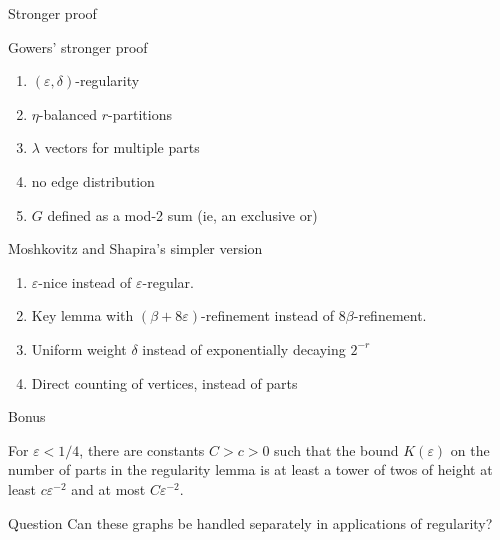 \documentclass{beamer}
\newcommand{\1}{\mathbbm{1}}
\newcommand{\eps}{\varepsilon}
\begin{document}
\begin{frame}{Stronger proof}
  \begin{block}{Gowers' stronger proof}
    \begin{enumerate}
      \pause
    \item $(\eps, \delta)$-regularity

      \pause
      \item $\eta$-balanced $r$-partitions

            \pause
      \item $\lambda$ vectors for multiple parts

            \pause
      \item no edge distribution

            \pause
      \item $G$ defined as a mod-2 sum (ie, an exclusive or)
    \end{enumerate}
  \end{block}

  \pause
  \begin{block}{Moshkovitz and Shapira's simpler version}
    \begin{enumerate}
      \item $\eps$-nice instead of $\eps$-regular.

            \pause
      \item Key lemma with $(\beta + 8\eps)$-refinement instead of $8 \beta$-refinement.

            \pause
      \item Uniform weight $\delta$ instead of exponentially decaying $2^{-r}$

            \pause
      \item Direct counting of vertices, instead of parts
    \end{enumerate}
  \end{block}
\end{frame}

\begin{frame}{Bonus}
  \begin{theorem}
    For $\eps < 1/4$, there are constants $C > c > 0$ such that the bound $K(\eps)$ on
    the number of parts in the regularity lemma is at least a tower of twos of height at
    least $c \eps^{-2}$ and at most $C \eps^{-2}$.
  \end{theorem}

  \begin{block}{Question}
    Can these graphs be handled separately in applications of regularity?
  \end{block}
\end{frame}
\end{document}

